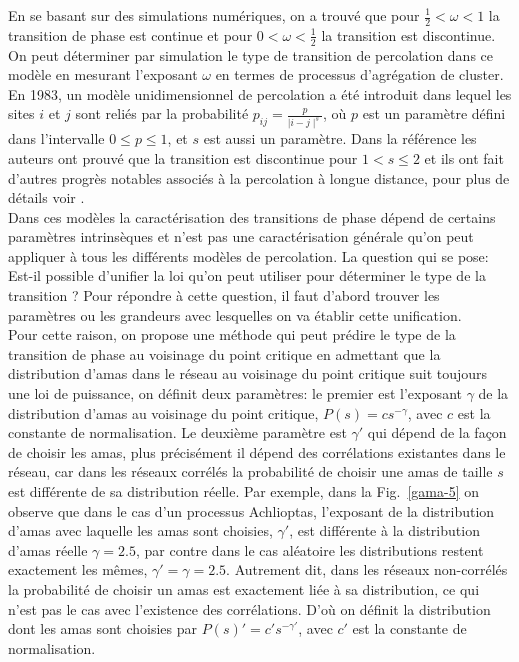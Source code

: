 En se basant sur des simulations numériques, on a trouvé que pour $\frac{1}{2}<\omega<1$ la transition de phase est continue et pour $0<\omega<\frac{1}{2}$ la transition est discontinue. On peut déterminer par simulation le type de transition de percolation dans ce modèle en mesurant l'exposant $\omega$ en termes de processus d'agrégation de cluster. En 1983, un modèle unidimensionnel de percolation a été introduit \cite{Schulman1983} dans lequel les sites $i$ et $j$ sont reliés par la probabilité $p_{ij}=\frac{p}{\mid i-j\mid^s}$, où $p$ est un paramètre défini dans l'intervalle $0\leq p\leq1$, et $s$ est aussi un paramètre. Dans la référence \cite{Aizenman-Newman1986} les auteurs ont prouvé que la transition est discontinue pour $1<s\leq2$ et ils ont fait d'autres progrès notables associés à la percolation à longue distance, pour plus de détails voir \cite{Lee-al2016}.\\
Dans ces modèles la caractérisation des transitions de phase dépend de certains paramètres intrinsèques  et n'est pas une caractérisation générale qu'on peut appliquer à tous les différents modèles de percolation. La question qui se pose: Est-il possible d'unifier la loi qu'on peut utiliser pour déterminer le type de la transition ? Pour répondre à cette question, il faut d'abord trouver les paramètres ou les grandeurs avec lesquelles on va établir cette unification.\\
Pour cette raison, on propose une méthode qui peut prédire le type de la transition de phase au voisinage du point critique en admettant que la distribution d'amas dans le réseau au voisinage du point critique suit toujours une loi de puissance, on définit deux paramètres: le premier est l'exposant $\gamma$ de la distribution d'amas au voisinage du point critique, $P(s)=cs^{-\gamma}$, avec $c$ est la constante de normalisation. Le deuxième paramètre est $\gamma'$ qui dépend de la façon de choisir les amas, plus précisément il dépend des corrélations existantes dans le réseau, car dans les réseaux corrélés la probabilité de choisir une amas de taille $s$ est différente de sa distribution réelle. Par exemple, dans la Fig.~\ref{gama-5} on observe que dans le cas d'un processus Achlioptas, l'exposant de la distribution d'amas avec laquelle les amas sont choisies, $\gamma'$, est différente à la distribution d'amas réelle $\gamma=2.5$, par contre dans le cas aléatoire les distributions restent exactement les mêmes, $\gamma'=\gamma=2.5$. Autrement dit, dans les réseaux non-corrélés la probabilité de choisir un amas est exactement liée à sa distribution, ce qui n'est pas le cas avec l'existence des corrélations. D'où on définit la distribution dont les amas sont choisies par $P(s)'=c's^{-\gamma'}$, avec $c'$ est la constante de normalisation.
